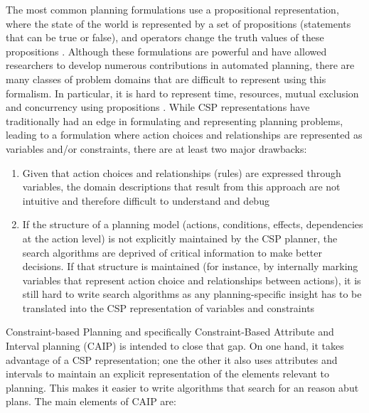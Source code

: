 The most common planning formulations use a propositional
representation, where the state of the world is represented by a set
of propositions (statements that can be true or false), and operators
change the truth values of these propositions \cite{gen87}. Although
these formulations are powerful and have allowed researchers to
develop numerous contributions in automated planning, there are many
classes of problem domains that are difficult to represent using this
formalism. In particular, it is hard to represent time, resources,
mutual exclusion and concurrency using propositions . While CSP representations have traditionally had an edge in
formulating and representing planning problems, 
leading to a formulation where action choices and relationships are
represented as variables and/or constraints, there are at least two
major drawbacks:

\begin{enumerate} 

\item Given that action choices and relationships (rules) are expressed
  through variables, the domain descriptions that result from this
  approach are not intuitive and therefore difficult to understand and
  debug

\item If the structure of a planning model (actions, conditions,
  effects, dependencies at the action level) is not explicitly
  maintained by the CSP planner, the search algorithms are deprived of
  critical information to make better decisions. If that structure is
  maintained (for instance, by internally marking variables that
  represent action choice and relationships between actions), it is
  still hard to write search algorithms as any planning-specific
  insight has to be translated into the CSP representation of
  variables and constraints 

\end{enumerate}

Constraint-based Planning and specifically Constraint-Based Attribute
and Interval planning (CAIP) \cite{mus94,frank2003} is intended to
close that gap. On one hand, it takes advantage of a CSP
representation; one the other it also uses attributes and intervals to
maintain an explicit representation of the elements relevant to
planning. This makes it easier to write algorithms that search for an
reason abut plans. The main elements of CAIP are:

